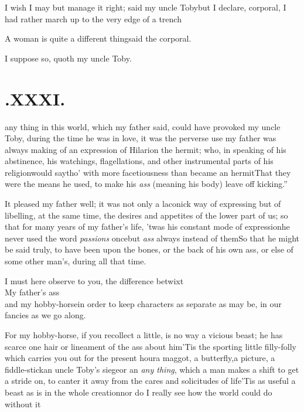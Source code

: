 \documentclass[twoside]{article}
\begin{document}
I wish I may but manage it right; said my uncle
Toby\tsk but I declare, corporal, I had rather march up to
the very edge of a trench\tsh{}

\tsk A woman is quite a different thing\break\tsk said the
corporal.

\tsk I suppose so, quoth my uncle Toby.

\section{.\enspace XXXI.}

 any thing in this world, which my\break
father said, could have provoked my uncle Toby, during the
time he was in love, it was the perverse use my father was always
making of an expression of Hilarion the hermit; who, in
speaking of his abstinence, his watchings, flagellations, and other
instrumental parts of his religion\tsk would say\tsk tho’
with more facetiousness than became an
hermit\tsk \lqq That they were the means he used, to make
his \textit{ass} (meaning his body) leave off
kicking.”

It pleased my father well; it was not only a laconick way of
expressing\tsh\break
but of libelling, at the same time, the desires and appetites of
the lower part of us; so that for many years of my father’s
life, ’twas his constant mode of expression\tsk he never used
the word \textit{passions} once\tsk but \textit{ass} always
instead of them\tsh So that he might be said truly, to have been
upon the bones, or the back of his own ass, or else of some
other man’s, during all that time.

I must here observe to you, the difference betwixt\\
\null\qquad My father’s ass\\
\null\qquad and my hobby-horse\tsk in order to keep
characters as separate as may be, in our fancies as we go
along.

For my hobby-horse, if you recollect a little, is no way a
vicious beast; he has scarce one hair or lineament of the ass about
him\tsh ’Tis the sporting little filly-folly which
carries you out for the present hour\tsk a
maggot, a butterfly,\break a
picture, a fiddle-stick\tsk an uncle Toby’s
siege\tsk or an \textit{any thing}, which a man makes a shift to
get a stride on, to canter it away from the cares and solicitudes
of life\tsk ’Tis as useful a beast as is in the whole
creation\tsk nor do I really see how the world could do without
it\tsh
\end{document}
